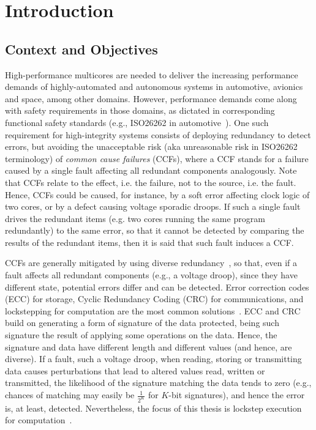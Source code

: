 \clearpage
\newpage
\section{Introduction}




\subsection{Context and Objectives}

High-performance multicores are needed to deliver the increasing performance demands of highly-automated and autonomous systems in automotive, avionics and space, among other domains. However, performance demands come along with safety requirements in those domains, as dictated in corresponding functional safety standards (e.g., ISO26262 in automotive~\cite{ISO26262}).
One such requirement for high-integrity systems consists of deploying redundancy to detect errors, but avoiding the unacceptable risk (aka unreasonable risk in ISO26262 terminology) of \emph{common cause failures} (CCFs), where a CCF stands for a failure caused by a single fault affecting all redundant components analogously. Note that CCFs relate to the effect, i.e. the failure, not to the source, i.e. the fault. Hence, CCFs could be caused, for instance, by a soft error affecting clock logic of two cores, or by a defect causing voltage sporadic droops. If such a single fault drives the redundant items (e.g. two cores running the same program redundantly) to the same error, so that it cannot be detected by comparing the results of the redundant items, then it is said that such fault induces a CCF.

CCFs are generally mitigated by using diverse redundancy~\cite{ClassicDiversity}, so that, even if a fault affects all redundant components (e.g., a voltage droop), since they have different state, potential errors differ and can be detected. Error correction codes (ECC) for storage, Cyclic Redundancy Coding (CRC) for communications, and lockstepping for computation are the most common solutions~\cite{alcaide2019software}. ECC and CRC build on generating a form of signature of the data protected, being such signature the result of applying some operations on the data. Hence, the signature and data have different length and different values (and hence, are diverse). If a fault, such a voltage droop, when reading, storing or transmitting data causes perturbations that lead to altered values read, written or transmitted, the likelihood of the signature matching the data tends to zero (e.g., chances of matching may easily be $\frac{1}{2^K}$ for $K$-bit signatures), and hence the error is, at least, detected.
Nevertheless, the focus of this thesis is lockstep execution for computation~\cite{STlockstep,infineon2012aurix,iturbe2019arm,paper1}. 

